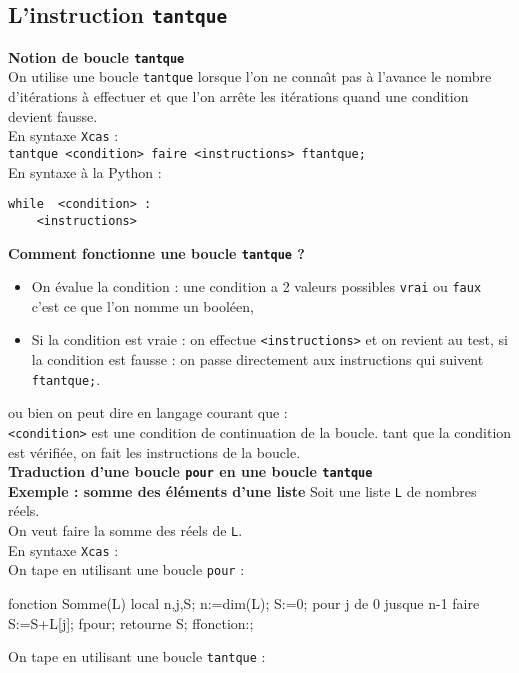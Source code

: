 \documentclass[12pt,a4paper]{book}
\begin{document}
\begin{giacjshere}
\section{L'instruction {\tt tantque}}\label{sec:Somme}
{\bf Notion de boucle {\tt tantque}}\\
On utilise une boucle {\tt tantque} lorsque l'on ne conna\^{\i}t pas \`a 
l'avance le nombre d'it\'erations \`a effectuer et que l'on arr\^ete les 
it\'erations quand une condition devient fausse.\\
En syntaxe {\tt Xcas} :\\
{\tt tantque <condition> faire <instructions> ftantque;}\\
En syntaxe \`a la Python :\\
\begin{verbatim}
while  <condition> :
    <instructions>
\end{verbatim}
{\bf Comment fonctionne une boucle {\tt tantque} ?}
\begin{itemize}
\item On \'evalue la condition : une condition a 2 valeurs possibles {\tt vrai}
 ou {\tt faux} c'est ce que l'on nomme un bool\'een,
\item Si la condition est vraie : on effectue  {\tt <instructions>}
et on revient au test,
si la condition est fausse : on passe directement aux 
instructions qui suivent 
{\tt ftantque;}.
\end{itemize}
ou bien on peut dire en langage courant que :\\
{\tt <condition>} est une condition de continuation de la boucle.
tant que la condition est v\'erifi\'ee, on fait les instructions de la boucle.\\
{\bf Traduction d'une boucle {\tt pour} en une boucle {\tt tantque}}\\
{\bf Exemple : somme des \'el\'ements d'une liste}
Soit une liste {\tt L} de nombres r\'eels.\\
On veut faire la somme des r\'eels de {\tt L}.\\
En syntaxe {\tt Xcas} :\\
On tape en utilisant une boucle {\tt pour} :
\begin{giaconload}
fonction Somme(L) 
 local n,j,S;
 n:=dim(L);
 S:=0;
 pour j de 0 jusque n-1 faire
   S:=S+L[j];
 fpour;
 retourne S;
ffonction:;
\end{giaconload}
On tape en utilisant une boucle {\tt tantque} :
\begin{giaconload}

\end{giaconload}
\end{giacjshere}
\end{document}
